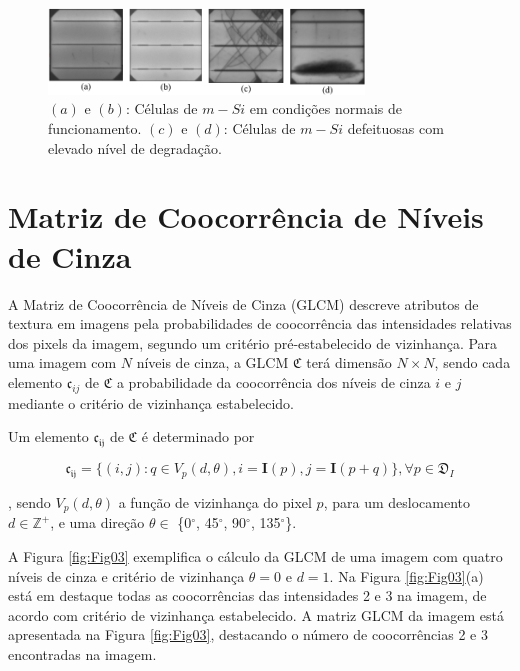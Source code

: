 \documentclass[a4paper]{ifacconf}
\begin{document}
\begin{figure}[hbt!]
\begin{center}
\includegraphics[width=8.4cm]{imgs/Fig01.png}    %
\caption{$(a)$ e $(b)$: Células de $m-Si$ em condições normais de funcionamento. $(c)$ e $(d)$: Células de $m-Si$ defeituosas com elevado nível de degradação.} 
\label{fig:Fig01}
\end{center}
\end{figure}

\section{Matriz de Coocorrência de Níveis de Cinza}

A Matriz de Coocorrência de Níveis de Cinza (GLCM) \citep{Haralick1973} descreve atributos de textura em imagens pela probabilidades de coocorrência das intensidades relativas dos pixels da imagem, segundo um critério pré-estabelecido de vizinhança. Para uma imagem com $N$ níveis de cinza, a GLCM $\mathfrak{C}$ terá dimensão $N \times N$, sendo cada elemento $\mathfrak{c}_{ij}$ de $\mathfrak{C}$ a probabilidade da coocorrência dos níveis de cinza $i$ e $j$ mediante o critério de vizinhança estabelecido.

Um elemento $\mathfrak{c_{ij}}$ de $\mathfrak{C}$ é determinado por

\begin{equation}\label{eq:01}
	\mathfrak{c_{ij}} = \{(i,j) : q \in V_p(d, \theta), i = \textbf{I}(p), j = \textbf{I}(p + q)\}, \forall{p} \in \mathfrak{D}_I 
\end{equation}   
 
, sendo $V_p(d, \theta)$ a função de vizinhança do pixel $p$, para um deslocamento $d \in \mathbb{Z}^{+}$, e uma direção $\theta \in$ \{0$^{\circ}$, 45$^{\circ}$, 90$^{\circ}$, 135$^{\circ}$\}. 

A Figura \ref{fig:Fig03} exemplifica o cálculo da GLCM de uma imagem com quatro níveis de cinza e critério de vizinhança $\theta = 0$ e $d = 1$. Na Figura \ref{fig:Fig03}(a) está em destaque todas as coocorrências das intensidades 2 e 3 na imagem, de acordo com critério de vizinhança estabelecido. A matriz GLCM da imagem está apresentada na Figura \ref{fig:Fig03}, destacando o número de coocorrências 2 e 3 encontradas na imagem.  
\end{document}
